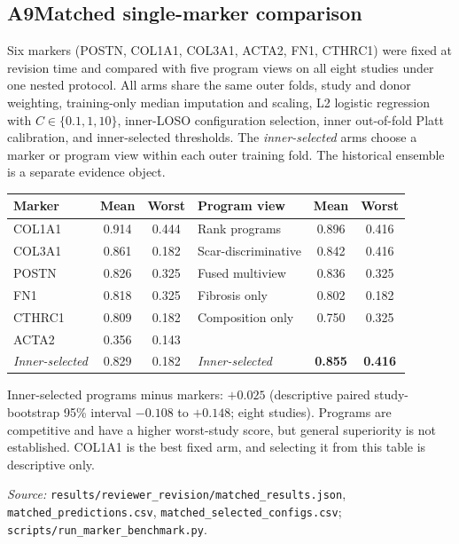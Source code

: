 \subsection*{A9\quad Matched single-marker comparison}
\label{app:markers}

Six markers (POSTN, COL1A1, COL3A1, ACTA2, FN1, CTHRC1) were fixed at revision
time and compared with five program views on all eight studies under one nested
protocol. All arms share the same outer folds, study and donor weighting,
training-only median imputation and scaling, L2 logistic regression with
$C\in\{0.1,1,10\}$, inner-LOSO configuration selection, inner out-of-fold Platt
calibration, and inner-selected thresholds. The \emph{inner-selected} arms
choose a marker or program view within each outer training fold. The
historical ensemble is a separate evidence object.

{\small
\begin{tabular}{@{}lcc|lcc@{}}
\toprule
Marker & Mean & Worst & Program view & Mean & Worst \\
\midrule
COL1A1 & 0.914 & 0.444 & Rank programs & 0.896 & 0.416 \\
COL3A1 & 0.861 & 0.182 & Scar-discriminative & 0.842 & 0.416 \\
POSTN  & 0.826 & 0.325 & Fused multiview & 0.836 & 0.325 \\
FN1    & 0.818 & 0.325 & Fibrosis only & 0.802 & 0.182 \\
CTHRC1 & 0.809 & 0.182 & Composition only & 0.750 & 0.325 \\
ACTA2  & 0.356 & 0.143 & & & \\
\midrule
\textit{Inner-selected} & 0.829 & 0.182 & \textit{Inner-selected} & \textbf{0.855} & \textbf{0.416} \\
\bottomrule
\end{tabular}
}

\smallskip
Inner-selected programs minus markers: $+0.025$ (descriptive paired
study-bootstrap 95\% interval $-0.108$ to $+0.148$; eight studies). Programs are
competitive and have a higher worst-study score, but general superiority is not
established. COL1A1 is the best fixed arm, and selecting it from this table is
descriptive only.

\noindent\textit{Source:} \texttt{results/reviewer\_revision/matched\_results.json},
\texttt{matched\_predictions.csv}, \texttt{matched\_selected\_configs.csv};
\texttt{scripts/run\_marker\_benchmark.py}.

